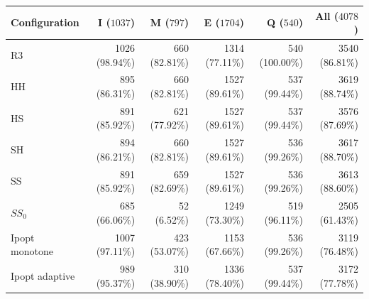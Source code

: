 \begin{tabular}{@{}lrrrrr@{}}
\toprule
Configuration & I ($1037$) & M ($797$) & E ($1704$) & Q ($540$) & All ($4078$)\\
\midrule
R3 & 1026 (98.94\%) & 660 (82.81\%) & 1314 (77.11\%) & 540 (100.00\%) & 3540 (86.81\%)\\
HH & 895 (86.31\%) & 660 (82.81\%) & 1527 (89.61\%) & 537 (99.44\%) & 3619 (88.74\%)\\
HS & 891 (85.92\%) & 621 (77.92\%) & 1527 (89.61\%) & 537 (99.44\%) & 3576 (87.69\%)\\
SH & 894 (86.21\%) & 660 (82.81\%) & 1527 (89.61\%) & 536 (99.26\%) & 3617 (88.70\%)\\
SS & 891 (85.92\%) & 659 (82.69\%) & 1527 (89.61\%) & 536 (99.26\%) & 3613 (88.60\%)\\
$SS_0$ & 685 (66.06\%) & 52 (6.52\%) & 1249 (73.30\%) & 519 (96.11\%) & 2505 (61.43\%)\\
Ipopt monotone & 1007 (97.11\%) & 423 (53.07\%) & 1153 (67.66\%) & 536 (99.26\%) & 3119 (76.48\%)\\
Ipopt adaptive & 989 (95.37\%) & 310 (38.90\%) & 1336 (78.40\%) & 537 (99.44\%) & 3172 (77.78\%)\\
\bottomrule
\end{tabular}
